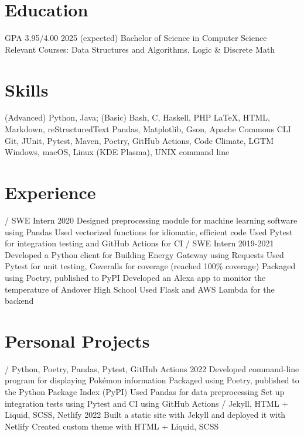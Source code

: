 \begin{outline}
\renewcommand{\outlinei}{description}

\0 \section{Education}
     GPA 3.95/4.00 \hfill 2025 (expected)
        \2 Bachelor of Science in Computer Science
        \2 Relevant Courses: Data Structures and Algorithms, Logic \& Discrete Math

\0 \section{Skills}
     \hfill (Advanced) Python, Java; (Basic) Bash, C, Haskell, PHP 
     \hfill \LaTeX, HTML, Markdown, reStructuredText 
    \1[Libraries] \hfill Pandas, Matplotlib, Gson, Apache Commons CLI 
    \1[Tools] \hfill Git, JUnit, Pytest, Maven, Poetry, GitHub Actions, Code Climate, LGTM 
     \hfill Windows, macOS, Linux (KDE Plasma), UNIX command line 

\0 \section{Experience}
     / SWE Intern \hfill 2020
        \2 Designed preprocessing module for machine learning software using Pandas
        \2 Used vectorized functions for idiomatic, efficient code
        \2 Used Pytest for integration testing and GitHub Actions for CI
     / SWE Intern \hfill 2019-2021
        \2 Developed a Python client for Building Energy Gateway using Requests
        \2 Used Pytest for unit testing, Coveralls for coverage (reached 100\% coverage)
        \2 Packaged using Poetry, published to PyPI
        \2 Developed an Alexa app to monitor the temperature of Andover High School
        \2 Used Flask and AWS Lambda for the backend

\0 \section{Personal Projects}
    \1[Pokésummary] / Python, Poetry, Pandas, Pytest, GitHub Actions \hfill 2022
        \2 Developed command-line program for displaying Pokémon information
        \2 Packaged using Poetry, published to the Python Package Index (PyPI)
        \2 Used Pandas for data preprocessing
        \2 Set up integration tests using Pytest and CI using GitHub Actions
     / Jekyll, HTML + Liquid, SCSS, Netlify \hfill 2022
        \2 Built a static site with Jekyll and deployed it with Netlify
        \2 Created custom theme with HTML + Liquid, SCSS


\end{outline}
